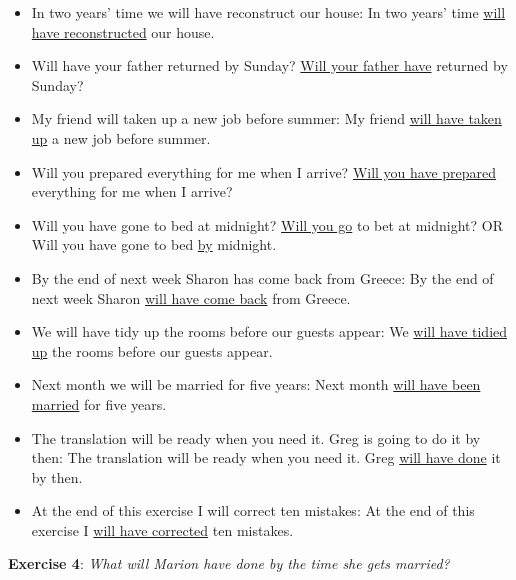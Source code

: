 \begin{itemize}

\item In two years' time we will have reconstruct our house: \newline In two years' time \underline{will have reconstructed} our house.
\item Will have your father returned by Sunday? \underline{Will your father have} returned by Sunday?
\item My friend will taken up a new job before summer: My friend \underline{will have taken up} a new job before summer. 
\item Will you prepared everything for me when I arrive? \underline{Will you have prepared} everything for me when I arrive?
\item Will you have gone to bed at midnight? \underline{Will you go} to bet at midnight? OR Will you have gone to bed \underline{by} midnight.
\item By the end of next week Sharon has come back from Greece: By the end of next week Sharon \underline{will have come back} from Greece.
\item We will have tidy up the rooms before our guests appear: We \underline{will have tidied up} the rooms before our guests appear. 
\item Next month we will be married for five years: Next month \underline{will have been married} for five years.
\item The translation will be ready when you need it. Greg is going to do it by then: The translation will be ready when you need it. Greg \underline{will have done} it by then.
\item At the end of this exercise I will correct ten mistakes: At the end of this exercise I \underline{will have corrected} ten mistakes.

\end{itemize}

\textbf{Exercise 4}: \textit{What will Marion have done by the time she gets married?}

